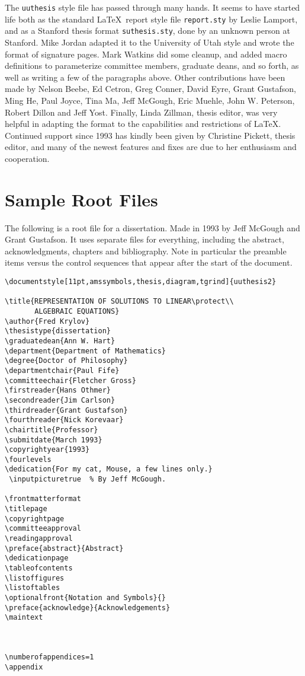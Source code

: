 The \verb|uuthesis| style file has passed through many hands.
It seems to have started life both as the standard \LaTeX\ report style
file \verb|report.sty| by Leslie Lamport, and as a Stanford thesis format
\verb|suthesis.sty|, done by an unknown person at Stanford. Mike Jordan
adapted
it to the University of Utah style and wrote the format of signature pages.
Mark Watkins did some cleanup, and added macro definitions to
parameterize committee members, graduate deans, and so forth, as well as
writing a few of the paragraphs above.  Other contributions have been
made by Nelson Beebe, Ed Cetron, Greg Conner, David Eyre, Grant
Gustafson, Ming He, Paul Joyce, Tina Ma, Jeff McGough, Eric Muehle, John
W. Peterson, Robert Dillon and Jeff Yost.  Finally, Linda Zillman,
thesis editor, was very helpful in adapting the format to the
capabilities and restrictions of \LaTeX. Continued support since 1993
has kindly been given by Christine Pickett, thesis editor, and many of
the newest features and fixes are due to her enthusiasm and cooperation.

\section{Sample Root Files}

\noindent The following is a root file for a dissertation. Made in 1993
by Jeff McGough and Grant Gustafson. It uses separate files for
everything, including the abstract, acknowledgments, chapters and
bibliography. Note in particular the preamble items versus the control
sequences that appear after the start of the document.

\begin{verbatim}
\documentstyle[11pt,amssymbols,thesis,diagram,tgrind]{uuthesis2}

\title{REPRESENTATION OF SOLUTIONS TO LINEAR\protect\\
       ALGEBRAIC EQUATIONS}
\author{Fred Krylov}
\thesistype{dissertation}
\graduatedean{Ann W. Hart}
\department{Department of Mathematics}
\degree{Doctor of Philosophy}
\departmentchair{Paul Fife}
\committeechair{Fletcher Gross}
\firstreader{Hans Othmer}
\secondreader{Jim Carlson}
\thirdreader{Grant Gustafson}
\fourthreader{Nick Korevaar}
\chairtitle{Professor}
\submitdate{March 1993}
\copyrightyear{1993}
\fourlevels
\dedication{For my cat, Mouse, a few lines only.}
 \inputpicturetrue  % By Jeff McGough.

\frontmatterformat
\titlepage
\copyrightpage
\committeeapproval
\readingapproval
\preface{abstract}{Abstract}
\dedicationpage
\tableofcontents
\listoffigures
\listoftables
\optionalfront{Notation and Symbols}{}
\preface{acknowledge}{Acknowledgements}
\maintext



\numberofappendices=1
\appendix




\end{verbatim}

